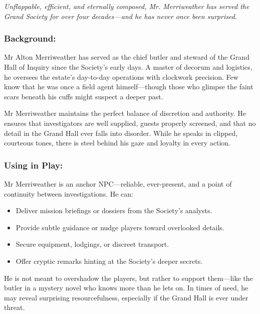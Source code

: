         \emph{Unflappable, efficient, and eternally composed, Mr. Merriweather has served the Grand Society for over four decades—and he has never once been surprised.}
        \vspace{.5\baselineskip}
      
    \begin{paracol}{3}
        \subsubsection*{Background:}
        Mr Alton Merriweather has served as the chief butler and steward of the Grand Hall of Inquiry since the Society's early days. A master of decorum and logistics, he oversees the estate’s day-to-day operations with clockwork precision. Few know that he was once a field agent himself—though those who glimpse the faint scars beneath his cuffs might suspect a deeper past.
      
        Mr Merriweather maintains the perfect balance of discretion and authority. He ensures that investigators are well supplied, guests properly screened, and that no detail in the Grand Hall ever falls into disorder. While he speaks in clipped, courteous tones, there is steel behind his gaze and loyalty in every action.
      
        \switchcolumn
        \subsubsection*{Using in Play:}
        Mr Merriweather is an anchor NPC—reliable, ever-present, and a point of continuity between investigations. He can:
        \begin{itemize}
          \item Deliver mission briefings or dossiers from the Society’s analysts.
          \item Provide subtle guidance or nudge players toward overlooked details.
          \item Secure equipment, lodgings, or discreet transport.
          \item Offer cryptic remarks hinting at the Society’s deeper secrets.
        \end{itemize}
        He is not meant to overshadow the players, but rather to support them—like the butler in a mystery novel who knows more than he lets on. In times of need, he may reveal surprising resourcefulness, especially if the Grand Hall is ever under threat.
      

\end{paracol}
